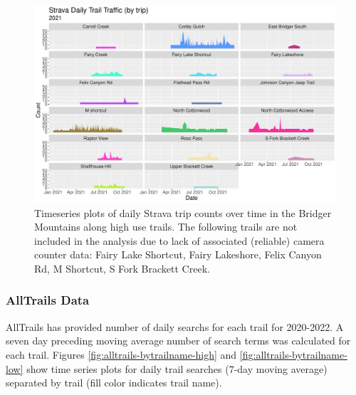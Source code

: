 \documentclass[
]{book}
\begin{document}
\begin{figure}

{\centering \includegraphics[width=1\linewidth]{../figures/Strava_day_TS_bytrip_low} 

}

\caption{Timeseries plots of daily Strava trip counts over time in the Bridger Mountains along high use trails. The following trails are not included in the analysis due to lack of associated (reliable) camera counter data: Fairy Lake Shortcut, Fairy Lakeshore, Felix Canyon Rd, M Shortcut, S Fork Brackett Creek.}\label{fig:strava-bytrailname-low}
\end{figure}

\hypertarget{ATData}{%
\subsubsection{AllTrails Data}\label{ATData}}

AllTrails has provided number of daily searchs for each trail for
2020-2022. A seven day preceding moving average number of search terms
was calculated for each trail. Figures
\ref{fig:alltrails-bytrailname-high} and
\ref{fig:alltrails-bytrailname-low} show time series plots for daily
trail searches (7-day moving average) separated by trail (fill color
indicates trail name).
\end{document}
